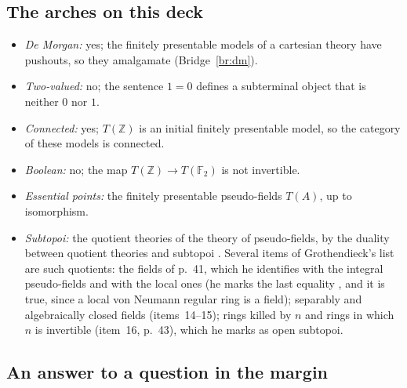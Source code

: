 \subsection{The arches on this deck}

\begin{itemize}
\item \emph{De Morgan:} yes; the finitely presentable models of a cartesian theory have pushouts, so they amalgamate (Bridge~\ref{br:dm}).
\item \emph{Two-valued:} no; the sentence $1=0$ defines a subterminal object that is neither $0$ nor $1$.
\item \emph{Connected:} yes; $T(\mathbb Z)$ is an initial finitely presentable model, so the category of these models is connected.
\item \emph{Boolean:} no; the map $T(\mathbb Z)\to T(\mathbb F_2)$ is not invertible.
\item \emph{Essential points:} the finitely presentable pseudo-fields $T(A)$, up to isomorphism.
\item \emph{Subtopoi:} the quotient theories of the theory of pseudo-fields, by the duality between quotient theories and subtopoi \cite{caramello-tst}. Several items of Grothendieck's list are such quotients: the fields of p.~41, which he identifies with the integral pseudo-fields and with the local ones (he marks the last equality , and it is true, since a local von Neumann regular ring is a field); separably and algebraically closed fields (items~14--15); rings killed by $n$ and rings in which $n$ is invertible (item~16, p.~43), which he marks as open subtopoi.
\end{itemize}

\subsection{An answer to a question in the margin}

